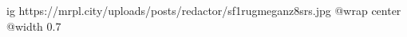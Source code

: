  
 
 
 
 

\ifcmt
  ig https://mrpl.city/uploads/posts/redactor/sf1rugmeganz8srs.jpg
  @wrap center
  @width 0.7
\fi
